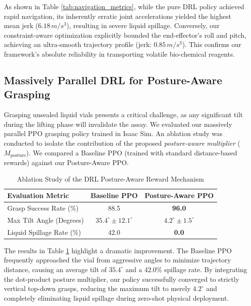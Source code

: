\documentclass[journal,twocolumn]{IEEEtran}
\begin{document}
As shown in Table \ref{tab:navigation_metrics}, while the pure DRL policy achieved rapid navigation, its inherently erratic joint accelerations yielded the highest mean jerk ($6.18\,m/s^3$), resulting in severe liquid spillage. Conversely, our constraint-aware optimization explicitly bounded the end-effector's roll and pitch, achieving an ultra-smooth trajectory profile (jerk: $0.85\,m/s^3$). This confirms our framework's absolute reliability in transporting volatile bio-chemical reagents.

\subsection{Massively Parallel DRL for Posture-Aware Grasping}
\label{subsec:exp_rl_grasping}

Grasping unsealed liquid vials presents a critical challenge, as any significant tilt during the lifting phase will invalidate the assay. We evaluated our massively parallel PPO grasping policy trained in Isaac Sim. An ablation study was conducted to isolate the contribution of the proposed \textit{posture-aware multiplier} ($M_{\text{posture}}$). We compared a Baseline PPO (trained with standard distance-based rewards) against our Posture-Aware PPO.

\begin{table}[!t]
\renewcommand{\arraystretch}{1.3}
\caption{Ablation Study of the DRL Posture-Aware Reward Mechanism}
\label{tab:rl_grasping}
\centering
\begin{tabular}{lcc}
\hline\hline
\textbf{Evaluation Metric} & \textbf{Baseline PPO} & \textbf{Posture-Aware PPO} \\ \hline
Grasp Success Rate (\%) & 88.5 & \textbf{96.0} \\
Max Tilt Angle (Degrees) & $35.4^\circ \pm 12.1^\circ$ & $\mathbf{4.2^\circ \pm 1.5^\circ}$ \\
Liquid Spillage Rate (\%) & 42.0 & \textbf{0.0} \\ \hline\hline
\end{tabular}
\end{table}

The results in Table \ref{tab:rl_grasping} highlight a dramatic improvement. The Baseline PPO frequently approached the vial from aggressive angles to minimize trajectory distance, causing an average tilt of $35.4^\circ$ and a 42.0\% spillage rate. By integrating the dot-product posture multiplier, our policy successfully converged to strictly vertical top-down grasps, reducing the maximum tilt to merely $4.2^\circ$ and completely eliminating liquid spillage during zero-shot physical deployment.
\end{document}
